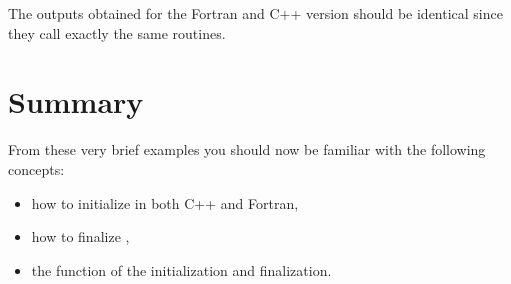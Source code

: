 \begin{tipbox}
The outputs obtained for the Fortran and C++ version should be identical
since they call exactly the same routines. 
\end{tipbox}

\section{Summary}
From these very brief examples you should now be familiar with the following 
concepts: 
\begin{itemize}
\item how to initialize \Atlas in both C++ and Fortran,
\item how to finalize \Atlas,
\item the function of the \Atlas initialization and finalization.
\end{itemize}
